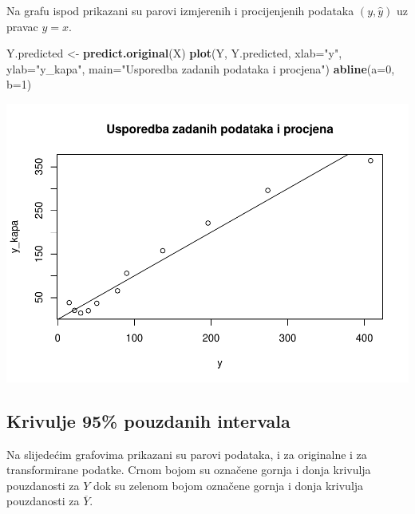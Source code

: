 \documentclass[]{article}
\newenvironment{Shaded}{\begin{snugshade}}{\end{snugshade}}
\newcommand{\KeywordTok}[1]{\textcolor[rgb]{0.13,0.29,0.53}{\textbf{{#1}}}}
\newcommand{\DataTypeTok}[1]{\textcolor[rgb]{0.13,0.29,0.53}{{#1}}}
\newcommand{\DecValTok}[1]{\textcolor[rgb]{0.00,0.00,0.81}{{#1}}}
\newcommand{\StringTok}[1]{\textcolor[rgb]{0.31,0.60,0.02}{{#1}}}
\newcommand{\NormalTok}[1]{{#1}}
\begin{document}
Na grafu ispod prikazani su parovi izmjerenih i procijenjenih podataka
\((y, \hat{y})\) uz pravac \(y=x\).

\begin{Shaded}
\begin{Highlighting}[]
\NormalTok{Y.predicted <-}\StringTok{ }\KeywordTok{predict.original}\NormalTok{(X)}
\KeywordTok{plot}\NormalTok{(Y, Y.predicted, }\DataTypeTok{xlab=}\StringTok{"y"}\NormalTok{, }\DataTypeTok{ylab=}\StringTok{"y_kapa"}\NormalTok{, }\DataTypeTok{main=}\StringTok{"Usporedba zadanih podataka i procjena"}\NormalTok{)}
\KeywordTok{abline}\NormalTok{(}\DataTypeTok{a=}\DecValTok{0}\NormalTok{, }\DataTypeTok{b=}\DecValTok{1}\NormalTok{)}
\end{Highlighting}
\end{Shaded}

\includegraphics{Izvjestaj_files/figure-latex/unnamed-chunk-15-1.pdf}

\subsection{Krivulje 95\% pouzdanih
intervala}\label{krivulje-95-pouzdanih-intervala}

Na slijedećim grafovima prikazani su parovi podataka, i za originalne i
za transformirane podatke. Crnom bojom su označene gornja i donja
krivulja pouzdanosti za \(Y\) dok su zelenom bojom označene gornja i
donja krivulja pouzdanosti za \(\overline{Y}\).
\end{document}
